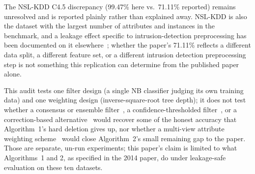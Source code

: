 The NSL-KDD C4.5 discrepancy (99.47\% here vs.\ 71.11\% reported) remains
unresolved and is reported plainly rather than explained away. NSL-KDD is
also the dataset with the largest number of attributes and instances in
the benchmark, and a leakage effect specific to intrusion-detection
preprocessing has been documented on it
elsewhere~\cite{bouke2023empirical}; whether the paper's 71.11\% reflects
a different data split, a different feature set, or a different intrusion
detection preprocessing step is not something this replication can
determine from the published paper alone.

This audit tests one filter design (a single NB classifier judging its
own training data) and one weighting design (inverse-square-root tree
depth); it does not test whether a consensus or ensemble
filter~\cite{brodley1999identifying}, a confidence-thresholded
filter~\cite{northcutt2021confident}, or a correction-based
alternative~\cite{jiang2024correction} would recover some of the honest
accuracy that Algorithm~1's hard deletion gives up, nor whether a
multi-view attribute weighting scheme~\cite{zhang2023multiview} would
close Algorithm~2's small remaining gap to the paper. Those are separate,
un-run experiments; this paper's claim is limited to what Algorithms~1 and
2, as specified in the 2014 paper, do under leakage-safe evaluation on
these ten datasets.
